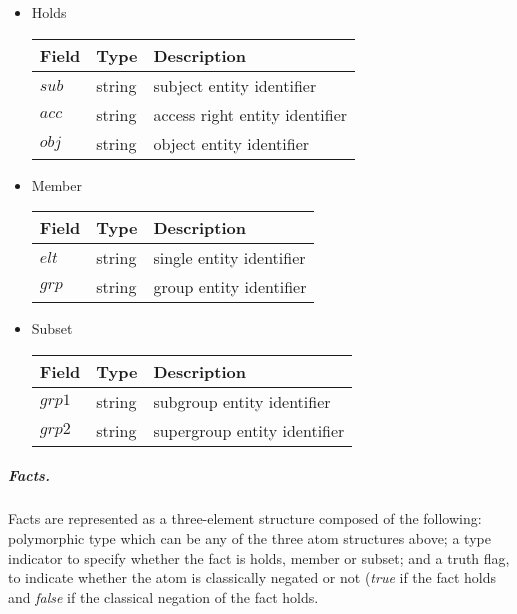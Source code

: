 \documentclass[10pt, twocolumn]{article}
\begin{document}
            \begin{itemize}
              \item
                Holds \\
                \begin{tabular}[t]{|l|l|l|}
                  \hline
                  \textbf{Field} & \textbf{Type} & \textbf{Description} \\
                  \hline
                  $sub$ & string & subject entity identifier \\
                  \hline
                  $acc$ & string & access right entity identifier \\
                  \hline
                  $obj$ & string & object entity identifier \\
                  \hline
                \end{tabular}

              \item
                Member \\
                \begin{tabular}[t]{|l|l|l|}
                  \hline
                  \textbf{Field} & \textbf{Type} & \textbf{Description} \\
                  \hline
                  $elt$ & string & single entity identifier \\
                  \hline
                  $grp$ & string & group entity identifier \\
                  \hline
                \end{tabular}

              \item
                Subset \\
                \begin{tabular}[t]{|l|l|l|}
                  \hline
                  \textbf{Field} & \textbf{Type} & \textbf{Description} \\
                  \hline
                  $grp1$ & string & subgroup entity identifier \\
                  \hline
                  $grp2$ & string & supergroup entity identifier \\
                  \hline
                \end{tabular}
              \end{itemize}

          \subparagraph{Facts.}

            Facts are represented as a three-element structure composed of the
            following: polymorphic type which can be any of the three atom
            structures above; a type indicator to specify whether the fact is
            holds, member or subset; and a truth flag, to indicate whether the
            atom is classically negated or not ({\em true} if the fact holds
            and {\em false} if the classical negation of the fact holds.
\end{document}
